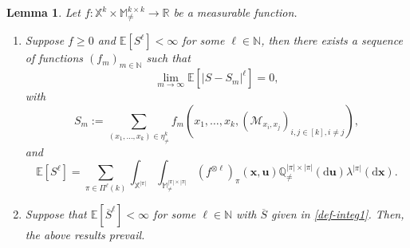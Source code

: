 \documentclass{article}
\newtheorem{lemma}[theorem]{Lemma}
\theoremstyle{definition}
\numberwithin{equation}{section}
\theoremstyle{remark}
\newcommand{\E}{\mathbb{E}}
\newcommand{\N}{\mathbb{N}}
\begin{document}
\begin{lemma}\label{lem:limits_S_n2}
   Let $f: \mathbb{X}^k\times \mathbb{M}^{k\times k}_{\neq}\to\mathbb{R}$ be a measurable function. 
\begin{enumerate}
\item[1)] Suppose $f\ge0$ and $\E[S^{\ell}]<\infty$ for some $\ell\in\N$, then there exists a sequence of functions $(f_m)_{m\in\N}$ such that 
\begin{equation}
    \lim_{m\to\infty}\E\left[\left|S-S_m\right|^{\ell}\right]=0,
\end{equation}
with 
$$S_m:=\sum_{(x_1,\ldots,x_k)\in\eta^k_{\neq}} f_m(x_1,\ldots,x_k, (\mathcal{M}_{x_i,x_j})_{i,j\in[k], i\neq j}),$$
and 
\begin{equation}
\E[S^{\ell}]=\sum_{\pi\in\Pi^\ell(k)}\int_{\mathbb{X}^{|\pi|}}\int_{\mathbb{M}^{|\pi|\times|\pi|}_{\ne}}(f^{\otimes\ell})_{\pi}(\bm{x},\bm{u})\mathbb{Q}^{|\pi|\times|\pi|}_{\ne}(\mathrm{d}\bm{u})\lambda^{|\pi|}(\mathrm{d}\bm{x}).
\end{equation}
\item[2)]Suppose that $\E[\overline{S}^{\ell}]<\infty$ for some $\ell\in\N$ with $\overline{S}$ given in \eqref{def-integ1}. Then, the above results prevail. 
\end{enumerate}
\end{lemma}
\end{document}
